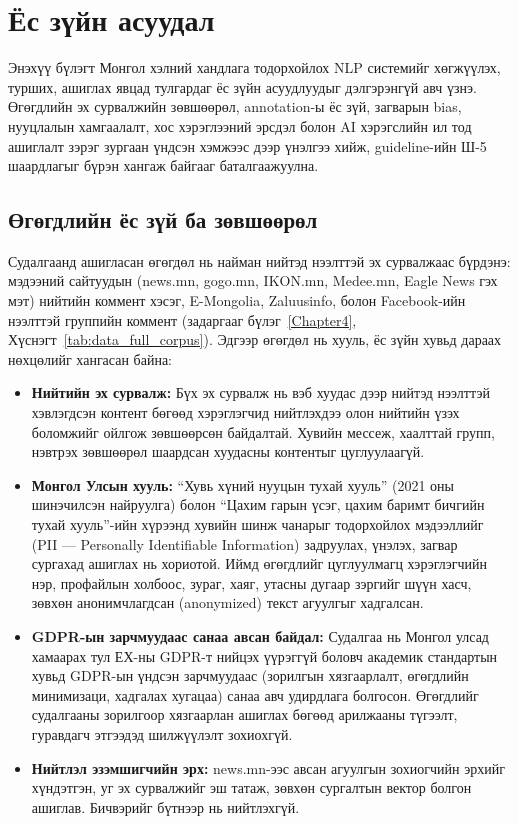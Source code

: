 ﻿%

\chapter{Ёс зүйн асуудал}
\label{Chapter7}

Энэхүү бүлэгт Монгол хэлний хандлага тодорхойлох NLP системийг хөгжүүлэх,
турших, ашиглах явцад тулгардаг ёс зүйн асуудлуудыг дэлгэрэнгүй авч үзнэ.
Өгөгдлийн эх сурвалжийн зөвшөөрөл, annotation-ы ёс зүй, загварын bias,
нууцлалын хамгаалалт, хос хэрэглээний эрсдэл болон AI хэрэгслийн ил тод
ашиглалт зэрэг зургаан үндсэн хэмжээс дээр үнэлгээ хийж, guideline-ийн Ш-5
шаардлагыг бүрэн хангаж байгааг баталгаажуулна.

\section{Өгөгдлийн ёс зүй ба зөвшөөрөл}

Судалгаанд ашигласан өгөгдөл нь найман нийтэд нээлттэй эх сурвалжаас бүрдэнэ:
мэдээний сайтуудын (news.mn, gogo.mn, IKON.mn, Medee.mn, Eagle News гэх мэт)
нийтийн коммент хэсэг, E-Mongolia, Zaluusinfo, болон Facebook-ийн нээлттэй
группийн коммент (задаргааг бүлэг~\ref{Chapter4}, Хүснэгт~\ref{tab:data_full_corpus}).
Эдгээр өгөгдөл нь хууль, ёс зүйн хувьд дараах нөхцөлийг хангасан байна:

\begin{itemize}
  \item \textbf{Нийтийн эх сурвалж:} Бүх эх сурвалж нь вэб хуудас дээр
    нийтэд нээлттэй хэвлэгдсэн контент бөгөөд хэрэглэгчид нийтлэхдээ олон
    нийтийн үзэх боломжийг ойлгож зөвшөөрсөн байдалтай. Хувийн мессеж,
    хаалттай групп, нэвтрэх зөвшөөрөл шаардсан хуудасны контентыг цуглуулаагүй.
  \item \textbf{Монгол Улсын хууль:} ``Хувь хүний нууцын тухай хууль''
    (2021 оны шинэчилсэн найруулга) болон ``Цахим гарын үсэг, цахим баримт
    бичгийн тухай хууль''-ийн хүрээнд хувийн шинж чанарыг тодорхойлох
    мэдээллийг (PII --- Personally Identifiable Information) задруулах,
    үнэлэх, загвар сургахад ашиглах нь хориотой. Иймд өгөгдлийг цуглуулмагц
    хэрэглэгчийн нэр, профайлын холбоос, зураг, хаяг, утасны дугаар зэргийг
    шүүн хасч, зөвхөн анонимчлагдсан (anonymized) текст агуулгыг хадгалсан.
  \item \textbf{GDPR-ын зарчмуудаас санаа авсан байдал:} Судалгаа нь Монгол
    улсад хамаарах тул ЕХ-ны GDPR-т нийцэх үүрэггүй боловч академик стандартын
    хувьд GDPR-ын үндсэн зарчмуудаас (зорилгын хязгаарлалт, өгөгдлийн
    минимизаци, хадгалах хугацаа) санаа авч удирдлага болгосон. Өгөгдлийг судалгааны
    зорилгоор хязгаарлан ашиглах бөгөөд арилжааны түгээлт, гуравдагч этгээдэд
    шилжүүлэлт зохиохгүй.
  \item \textbf{Нийтлэл эзэмшигчийн эрх:} news.mn-ээс авсан агуулгын зохиогчийн
    эрхийг хүндэтгэн, уг эх сурвалжийг эш татаж, зөвхөн сургалтын вектор болгон
    ашиглав. Бичвэрийг бүтнээр нь нийтлэхгүй.
\end{itemize}


